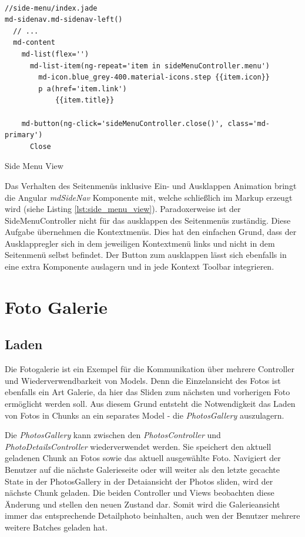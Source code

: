 \begin{listing}[H]
\begin{verbatim}

//side-menu/index.jade
md-sidenav.md-sidenav-left()
  // ...
  md-content
    md-list(flex='')
      md-list-item(ng-repeat='item in sideMenuController.menu')
        md-icon.blue_grey-400.material-icons.step {{item.icon}}
        p a(href='item.link')
            {{item.title}}
     
    md-button(ng-click='sideMenuController.close()', class='md-primary') 
      Close

\end{verbatim}
\caption{Side Menu View}
\label{lst:side_menu_view}
\end{listing} 

Das Verhalten des Seitenmenüs inklusive Ein- und Ausklappen Animation bringt die Angular \textit{mdSideNav} Komponente mit, welche schließlich im Markup erzeugt wird (siehe Listing \ref{lst:side_menu_view}). Paradoxerweise ist der SideMenuController nicht für das ausklappen des Seitenmenüs zuständig. Diese Aufgabe übernehmen die Kontextmenüs. Dies hat den einfachen Grund, dass der Ausklappregler sich in dem jeweiligen Kontextmenü links und nicht in dem Seitenmenü selbst befindet. Der Button zum ausklappen lässt sich ebenfalls in eine extra Komponente auslagern und in jede Kontext Toolbar integrieren. 

\section{Foto Galerie}
\label{sec:photo_gallery}

\subsection{Laden}

Die Fotogalerie ist ein Exempel für die Kommunikation über mehrere Controller und Wiederverwendbarkeit von Models. Denn die Einzelansicht des Fotos ist ebenfalls ein Art Galerie, da hier das Sliden zum nächsten und vorherigen Foto ermöglicht werden soll. Aus diesem Grund entsteht die Notwendigkeit das Laden von Fotos in Chunks an ein separates Model - die \textit{PhotosGallery} auszulagern. 

Die \textit{PhotosGallery} kann zwischen den \textit{PhotosController} und \textit{PhotoDetailsController} wiederverwendet werden. Sie speichert den aktuell geladenen Chunk an Fotos sowie das aktuell ausgewählte Foto. Navigiert der Benutzer auf die nächste Galerieseite oder will weiter als den letzte gecachte State in der PhotosGallery in der Detaiansicht der Photos sliden, wird der nächste Chunk geladen. Die beiden Controller und Views beobachten diese Änderung und stellen den neuen Zustand dar. Somit wird die Galerieansicht immer das entsprechende Detailphoto beinhalten, auch wen der Benutzer mehrere weitere Batches geladen hat.

